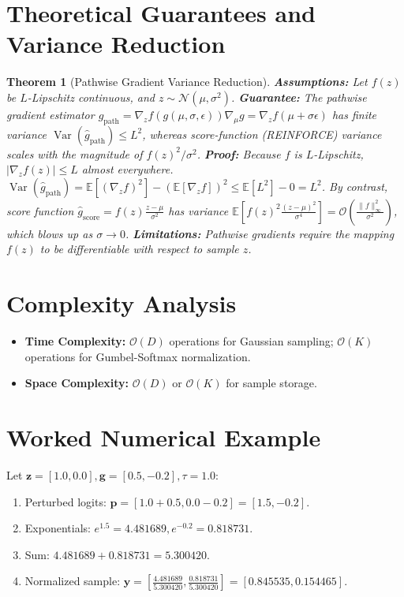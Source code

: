 \documentclass[11pt]{article}
\newtheorem{theorem}{Theorem}
\begin{document}
\section{Theoretical Guarantees and Variance Reduction}
\label{sec:guarantees}

\begin{theorem}[Pathwise Gradient Variance Reduction]
\label{thm:pathwise_variance}
\textbf{Assumptions:} Let $f(z)$ be $L$-Lipschitz continuous, and $z \sim \mathcal{N}(\mu, \sigma^2)$.
\textbf{Guarantee:} The pathwise gradient estimator $\hat{g}_{\mathrm{path}} = \nabla_z f(g(\mu, \sigma, \epsilon)) \nabla_\mu g = \nabla_z f(\mu + \sigma \epsilon)$ has finite variance $\operatorname{Var}(\hat{g}_{\mathrm{path}}) \le L^2$, whereas score-function (REINFORCE) variance scales with the magnitude of $f(z)^2 / \sigma^2$.
\textbf{Proof:}
Because $f$ is $L$-Lipschitz, $|\nabla_z f(z)| \le L$ almost everywhere.
$\operatorname{Var}(\hat{g}_{\mathrm{path}}) = \mathbb{E}[(\nabla_z f)^2] - (\mathbb{E}[\nabla_z f])^2 \le \mathbb{E}[L^2] - 0 = L^2$.
By contrast, score function $\hat{g}_{\mathrm{score}} = f(z) \frac{z - \mu}{\sigma^2}$ has variance $\mathbb{E}\left[ f(z)^2 \frac{(z-\mu)^2}{\sigma^4} \right] = \mathcal{O}\left(\frac{\|f\|_\infty^2}{\sigma^2}\right)$, which blows up as $\sigma \to 0$.
\textbf{Limitations:} Pathwise gradients require the mapping $f(z)$ to be differentiable with respect to sample $z$.
\end{theorem}

\section{Complexity Analysis}
\label{sec:complexity}

\begin{itemize}
    \item \textbf{Time Complexity:} $\mathcal{O}(D)$ operations for Gaussian sampling; $\mathcal{O}(K)$ operations for Gumbel-Softmax normalization.
    \item \textbf{Space Complexity:} $\mathcal{O}(D)$ or $\mathcal{O}(K)$ for sample storage.
\end{itemize}

\section{Worked Numerical Example}
\label{sec:worked_example}

Let $\mathbf{z} = [1.0, 0.0], \mathbf{g} = [0.5, -0.2], \tau = 1.0$:
\begin{enumerate}
    \item Perturbed logits: $\mathbf{p} = [1.0 + 0.5, 0.0 - 0.2] = [1.5, -0.2]$.
    \item Exponentials: $e^{1.5} = 4.481689, e^{-0.2} = 0.818731$.
    \item Sum: $4.481689 + 0.818731 = 5.300420$.
    \item Normalized sample: $\mathbf{y} = \left[\frac{4.481689}{5.300420}, \frac{0.818731}{5.300420}\right] = [0.845535, 0.154465]$.
\end{enumerate}
\end{document}
